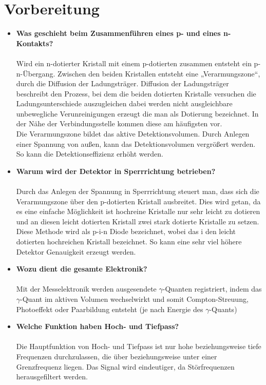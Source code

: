 \documentclass{article}
\begin{document}
	\section{Vorbereitung}
	\begin{itemize}
	\item \textbf{Was geschieht beim Zusammenführen eines p- und eines n-Kontakts?}\\\\
	Wird ein n-dotierter Kristall mit einem p-dotierten zusammen entsteht ein p-n-Übergang. Zwischen den beiden Kristallen entsteht eine „Verarmungszone“, durch die Diffusion der Ladungsträger. Diffusion der Ladungsträger beschreibt den Prozess, bei dem die beiden dotierten Kristalle versuchen die Ladungsunterschiede auszugleichen dabei werden nicht ausgleichbare unbewegliche Verunreinigungen erzeugt die man als Dotierung bezeichnet. In der Nähe der Verbindungsstelle kommen diese am häufigsten vor. \\
	Die Verarmungszone bildet das aktive Detektionsvolumen. Durch Anlegen einer Spannung von außen, kann das Detektionsvolumen vergrößert werden. So kann die Detektionseffizienz erhöht werden.
	\item \textbf{Warum wird der Detektor in Sperrrichtung betrieben?}\\\\
	Durch das Anlegen der Spannung in Sperrrichtung steuert man, dass sich die Verarmungszone über den p-dotierten Kristall ausbreitet. Dies wird getan, da es eine einfache Möglichkeit ist hochreine Kristalle nur sehr leicht zu dotieren und an diesen leicht dotierten Kristall zwei stark dotierte Kristalle zu setzen. Diese Methode wird als p-i-n Diode bezeichnet, wobei das i den leicht dotierten hochreichen Kristall bezeichnet.
	So kann eine sehr viel höhere Detektor Genauigkeit erzeugt werden.
	\item \textbf{Wozu dient die gesamte Elektronik?}\\\\
	Mit der Messelektronik werden ausgesendete $\gamma$-Quanten registriert, indem das $\gamma$-Quant im aktiven Volumen wechselwirkt und somit Compton-Streuung, Photoeffekt oder Paarbildung entsteht (je nach Energie des $\gamma$-Quants)
	\item \textbf{Welche Funktion haben Hoch- und Tiefpass?}\\\\
	Die Hauptfunktion von Hoch- und Tiefpass ist nur hohe beziehungsweise tiefe Frequenzen durchzulassen, die über beziehungsweise unter einer Grenzfrequenz liegen. Das Signal wird eindeutiger, da Störfrequenzen herausgefiltert werden.

\end{itemize}
\end{document}
